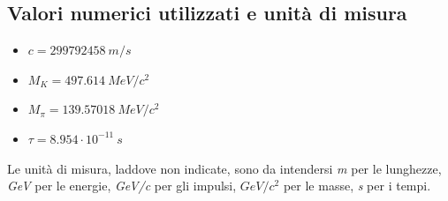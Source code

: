 \documentclass[8pt]{extarticle}
\begin{document}
\clearpage


\subsection{Valori numerici utilizzati e unità di misura}
\begin{itemize}
\item $c = 299792458\ m/s$
\item $M_K = 497.614\ MeV/c^2$
\item $M_\pi = 139.57018\ MeV/c^2$
\item $\tau = 8.954\cdot 10^{-11}\ s$
\end{itemize}

Le unità di misura, laddove non indicate, sono da intendersi \textit{m} per le lunghezze, \textit{GeV} per le energie, \textit{GeV/c} per gli impulsi, \textit{$GeV/c^2$} per le masse, \textit{s} per i tempi.
\end{document}

